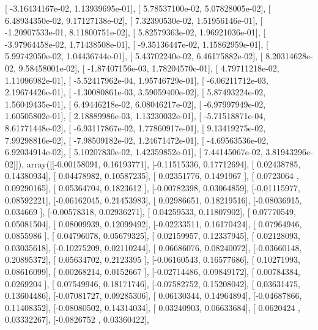 \documentclass{article}
\begin{document}
       [ -3.16434167e-02,   1.13939695e-01],
       [  5.78537100e-02,   5.07828005e-02],
       [  6.48934350e-02,   9.17127138e-02],
       [  7.32390530e-02,   1.51956146e-01],
       [ -1.20907533e-01,   8.11800751e-02],
       [  5.82579363e-02,   1.96921036e-01],
       [ -3.97964458e-02,   1.71438508e-01],
       [ -9.35136447e-02,   1.15862959e-01],
       [  5.99742050e-02,   1.04436744e-01],
       [  5.43702240e-02,   6.46175882e-02],
       [  8.20314628e-02,   9.58458001e-02],
       [ -1.87407156e-03,   1.78204570e-01],
       [  4.79711218e-02,   1.11096982e-01],
       [ -5.52417962e-04,   1.95746729e-01],
       [ -6.06211712e-03,   2.19674426e-01],
       [ -1.30080861e-03,   3.59059400e-02],
       [  5.87493224e-02,   1.56049435e-01],
       [  6.49446218e-02,   6.08046217e-02],
       [ -6.97997949e-02,   1.60505802e-01],
       [  2.18889986e-03,   1.13230032e-01],
       [ -5.71518871e-04,   8.61771448e-02],
       [ -6.93117867e-02,   1.77860917e-01],
       [  9.13419275e-02,   7.99298816e-02],
       [ -7.98509182e-02,   1.24671472e-01],
       [ -4.69563536e-02,   6.92034914e-02],
       [  5.10207830e-02,   1.42359852e-01],
       [  7.44145067e-02,   3.81943296e-02]]), array([[-0.00158091,  0.16193771],
       [-0.11515336,  0.17712694],
       [ 0.02438785,  0.14380934],
       [ 0.04478982,  0.10587235],
       [ 0.02351776,  0.1491967 ],
       [ 0.0723064 ,  0.09290165],
       [ 0.05364704,  0.1823612 ],
       [-0.00782398,  0.03064859],
       [-0.01115977,  0.08592221],
       [-0.06162045,  0.21453983],
       [ 0.02986651,  0.18219516],
       [-0.08036915,  0.034669  ],
       [-0.00578318,  0.02936271],
       [ 0.04259533,  0.11807902],
       [ 0.07770549,  0.05081504],
       [ 0.08009939,  0.12099492],
       [-0.02233511,  0.16170424],
       [ 0.07964946,  0.0855986 ],
       [ 0.04796078,  0.05679325],
       [ 0.02159957,  0.12337945],
       [ 0.02128093,  0.03035618],
       [-0.10275209,  0.02110244],
       [ 0.06686076,  0.08240072],
       [-0.03660148,  0.20895372],
       [ 0.05634702,  0.2123395 ],
       [-0.06160543,  0.16577686],
       [ 0.10271993,  0.08616099],
       [ 0.00268214,  0.0152667 ],
       [-0.02714486,  0.09849172],
       [ 0.00784384,  0.0269204 ],
       [ 0.07549946,  0.18171746],
       [-0.07582752,  0.15208042],
       [ 0.03631475,  0.13604486],
       [-0.07081727,  0.09285306],
       [ 0.06130344,  0.14964894],
       [-0.04687866,  0.11408352],
       [-0.08080502,  0.14314034],
       [ 0.03240903,  0.06633684],
       [ 0.0620424 ,  0.03332267],
       [-0.0826752 ,  0.03360422],
\end{document}
